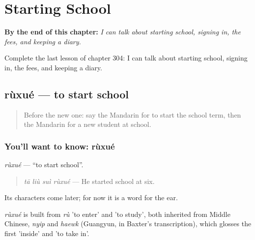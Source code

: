 
\chapter{Starting School}
\label{ch:zh-starting-school}

\begin{chapteropening}
\textbf{By the end of this chapter:} \emph{I can talk about starting school, signing in, the fees, and keeping a diary.}

Complete the last lesson of chapter 304: I can talk about starting school, signing in, the fees, and keeping a diary.
\end{chapteropening}

\section[rùxué]{rùxué — to start school}

\label{lesson:ZH-C304-ruxue}



\begin{quote}
Before the new one: say the Mandarin for to start the school term, then the Mandarin for a new student at school.
\end{quote}

\subsection*{You'll want to know: rùxué}
\emph{rùxué} — \textquotedblleft{}to start school\textquotedblright{}.

\begin{quote}
\emph{tā liù suì rùxué} — He started school at six.
\end{quote}

Its characters come later; for now it is a word for the ear.

\begin{cousinweb}
\emph{rùxué} is built from \emph{rù} 'to enter' and  'to study', both inherited from Middle Chinese, \emph{nyip} and \emph{haewk} (Guangyun, in Baxter's transcription), which glosses the first 'inside' and 'to take in'.
\end{cousinweb}

